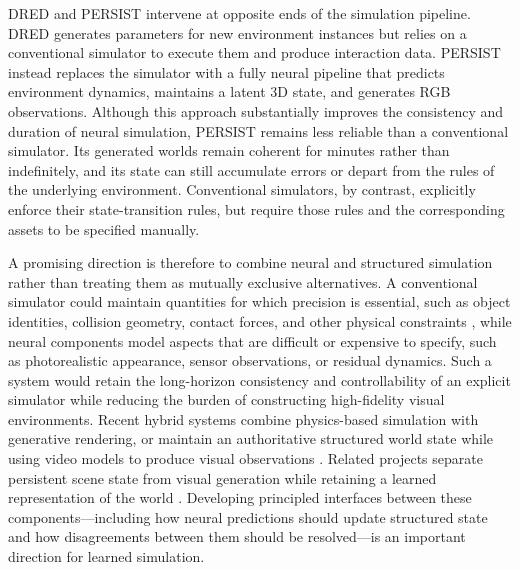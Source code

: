 DRED and PERSIST intervene at opposite ends of the simulation pipeline. DRED generates parameters for new environment instances but relies on a conventional simulator to execute them and produce interaction data. PERSIST instead replaces the simulator with a fully neural pipeline that predicts environment dynamics, maintains a latent 3D state, and generates RGB observations. Although this approach substantially improves the consistency and duration of neural simulation, PERSIST remains less reliable than a conventional simulator. Its generated worlds remain coherent for minutes rather than indefinitely, and its state can still accumulate errors or depart from the rules of the underlying environment. Conventional simulators, by contrast, explicitly enforce their state-transition rules, but require those rules and the corresponding assets to be specified manually.

A promising direction is therefore to combine neural and structured simulation rather than treating them as mutually exclusive alternatives. A conventional simulator could maintain quantities for which precision is essential, such as object identities, collision geometry, contact forces, and other physical constraints \citep{TodorovET12}, while neural components model aspects that are difficult or expensive to specify, such as photorealistic appearance, sensor observations, or residual dynamics. Such a system would retain the long-horizon consistency and controllability of an explicit simulator while reducing the burden of constructing high-fidelity visual environments. Recent hybrid systems combine physics-based simulation with generative rendering, or maintain an authoritative structured world state while using video models to produce visual observations \citep{mo2025dreamland,singh2026robloxreality}. Related projects separate persistent scene state from visual generation while retaining a learned representation of the world \citep{vastai2026projecteden}. Developing principled interfaces between these components---including how neural predictions should update structured state and how disagreements between them should be resolved---is an important direction for learned simulation.

